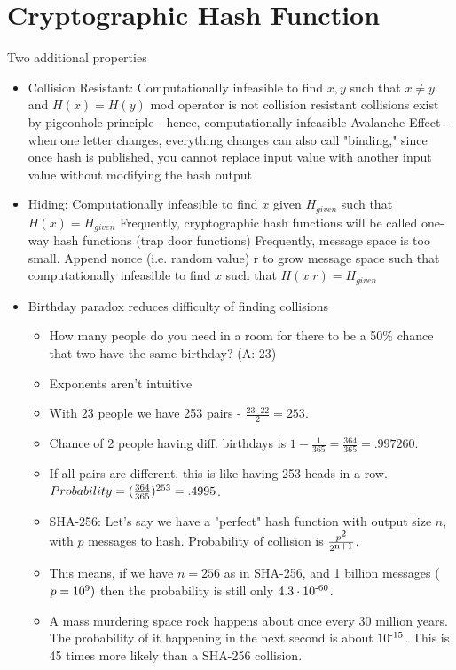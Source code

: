 \documentclass{article}
\begin{document}
\section*{Cryptographic Hash Function}
Two additional properties
\begin{itemize}
  \item Collision Resistant: Computationally infeasible to find $x, y$ such that $x \neq y$ and $H(x) = H(y)$
    \subitem mod operator is not collision resistant
    \subitem collisions exist by pigeonhole principle - hence, computationally infeasible
    \subitem Avalanche Effect - when one letter changes, everything changes
    \subitem can also call "binding," since once hash is published, you cannot replace input value with another input value without modifying the hash output
  \item Hiding: Computationally infeasible to find $x$ given $H_{given}$ such that $H(x) = H_{given}$
    \subitem Frequently, cryptographic hash functions will be called one-way hash functions (trap door functions)
    \subitem Frequently, message space is too small. Append nonce (i.e. random value) r to grow message space such that computationally infeasible to find $x$ such that $H(x|r) = H_{given}$
  \item Birthday paradox reduces difficulty of finding collisions 
    \begin{itemize}
      \item How many people do you need in a room for there to be a 50\% chance that two have the same birthday? (A: 23)
      \item Exponents aren't intuitive
      \item With 23 people we have 253 pairs - $\frac{23 \cdot 22}{2}=253$.
      \item Chance of 2 people having diff. birthdays is $1 - \frac{1}{365} = \frac{364}{365} = .997260$.
      \item If all pairs are different, this is like having 253 heads in a row. $Probability = (\frac{364}{365})\textsuperscript{253} = .4995$.
      \item SHA-256: Let's say we have a "perfect" hash function with output size $n$, with $p$ messages to hash. Probability of collision is $\frac{p\textsuperscript{2}}{2\textsuperscript{n+1}}$.
      \item This means, if we have $n=256$ as in SHA-256, and 1 billion messages ($p = 10\textsuperscript{9})$ then the probability is still only $4.3 \cdot 10\textsuperscript{-60}$.
      \item A mass murdering space rock happens about once every 30 million years. The probability of it happening in the next second is about $10\textsuperscript{-15}$. This is 45 times more likely than a SHA-256 collision.
    \end{itemize}

\end{itemize}
\end{document}
